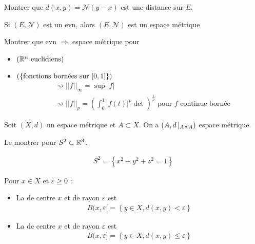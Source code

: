 \documentclass[french,a4paper,10pt]{article}
\begin{document}
	\begin{exercice}
			Montrer que $d(x,y) = \mathcal{N}(y-x)$ est une distance sur $E$.
	\end{exercice}
	
	\begin{remark}
		Si $(E, \mathcal{N})$ est un evn, alors $(E, \mathcal{N})$ est un espace métrique
	\end{remark}
	
	
	\begin{exercice}
		Montrer que evn $\Longrightarrow$ espace métrique pour
		\begin{itemize}
			\item $(\mathbb{R}^n \text{ euclidiens})$
			\item $(\{\text{fonctions bornées sur }\mathopen{[}0,1\mathclose{]}\})$
			\[\begin{aligned}
				&\rightsquigarrow||f||_\infty = \sup|f|\\
				&\rightsquigarrow||f||_p=\left(\int_0^1|f(t)|^p\det\right)^{\frac1p}\text{ pour }f\text{ continue bornée}
			\end{aligned}\]
		\end{itemize}
	\end{exercice} 
	
	
	\begin{example}
		Soit $(X,d)$ un espace métrique et $A\subset X$. On a $(A, d\mathop{}\!|_{A\times A})$ espace métrique.
	\end{example}
	
	\begin{exercice} 
		Le montrer pour $S^2\subset\mathbb{R}^3$.
	\end{exercice}
	\begin{rappel}
		\[\begin{aligned}
			S^2=\left\{x^2+y^2+z^2 = 1\right\}
		\end{aligned}\]
	\end{rappel}
	
	\begin{definition}
		Pour $x\in X$ et $\varepsilon\ge0$ :
		\begin{itemize}
			\item La  de centre $x$ et de rayon $\varepsilon$ est
			\[\begin{aligned}
				B(x,\varepsilon\mathopen{}[\mathclose{}=\left\{y\in X, d(x,y)<\varepsilon\right\}
			\end{aligned}\]
			\item La  de centre $x$ et de rayon $\varepsilon$ est
			\[\begin{aligned}
				B(x,\varepsilon\mathopen{}]\mathclose{}=\left\{y\in X, d(x,y)\le\varepsilon\right\}
			\end{aligned}\]
		\end{itemize}
	\end{definition}
	
\end{document}
